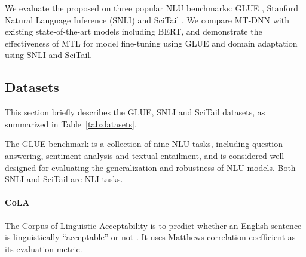 We evaluate the proposed {\MNAME} on three popular NLU benchmarks: GLUE \cite{wang2018glue}, Stanford Natural Language Inference (SNLI) \cite{snli2015} and SciTail \cite{scitail}. 
We compare MT-DNN with existing state-of-the-art models including BERT, 
and demonstrate the effectiveness of MTL for model fine-tuning using GLUE and domain adaptation using SNLI and SciTail. 


\subsection{Datasets}
\label{subsec:dataset}
This section briefly describes the GLUE, SNLI and SciTail datasets, as summarized in Table~\ref{tab:datasets}.

The GLUE benchmark is a collection of nine NLU tasks, including question answering, sentiment analysis and textual entailment, and is considered well-designed for evaluating the generalization and robustness of NLU models. 
Both SNLI and SciTail are NLI tasks. 

\paragraph{CoLA} The Corpus of Linguistic Acceptability is to predict whether an English sentence is linguistically “acceptable” or not \cite{cola2018}. %
It uses Matthews correlation coefficient \cite{matthews1975comparison} as its evaluation metric.

